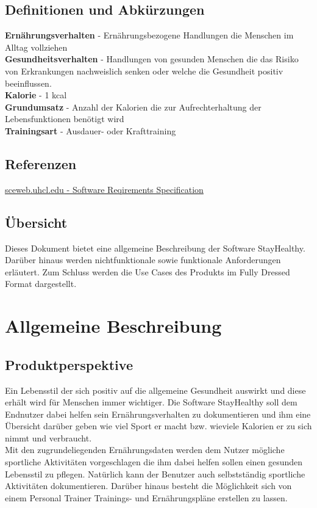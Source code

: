 \documentclass[12pt,a4paper,onecolumn]{article}
\begin{document}
\subsection{Definitionen und Abkürzungen}
\textbf{Ernährungsverhalten} - Ernährungsbezogene Handlungen die Menschen im Alltag vollziehen\\
\textbf{Gesundheitsverhalten} - Handlungen von gesunden Menschen die das Risiko von Erkrankungen nachweislich senken oder welche die Gesundheit positiv beeinflussen.\\
\textbf{Kalorie} - 1 kcal\\
\textbf{Grundumsatz} - Anzahl der Kalorien die zur Aufrechterhaltung der Lebensfunktionen benötigt wird\\
\textbf{Trainingsart} - Ausdauer- oder Krafttraining
\subsection{Referenzen}
\href{https://sceweb.uhcl.edu/helm/RationalUnifiedProcess/webtmpl/templates/req/rup_srs.htm}{sceweb.uhcl.edu - Software Reqirements Specification}
\subsection{Übersicht}
Dieses Dokument bietet eine allgemeine Beschreibung der Software StayHealthy. Darüber hinaus werden nichtfunktionale sowie funktionale Anforderungen erläutert. Zum Schluss werden die Use Cases des Produkts im Fully Dressed Format dargestellt.

\section{Allgemeine Beschreibung}
\subsection{Produktperspektive}
Ein Lebensstil der sich positiv auf die allgemeine Gesundheit auswirkt und diese erhält wird für Menschen immer wichtiger. Die Software StayHealthy soll dem Endnutzer dabei helfen sein Ernährungsverhalten zu dokumentieren und ihm eine Übersicht darüber geben wie viel Sport er macht bzw. wieviele Kalorien er zu sich nimmt und verbraucht.\\ Mit den zugrundeliegenden Ernährungsdaten werden dem Nutzer mögliche sportliche Aktivitäten vorgeschlagen die ihm dabei helfen sollen einen gesunden Lebensstil zu pflegen. Natürlich kann der Benutzer auch selbstständig sportliche Aktivitäten dokumentieren. Darüber hinaus besteht die Möglichkeit sich von einem Personal Trainer Trainings- und Ernährungspläne erstellen zu lassen.
\end{document}
